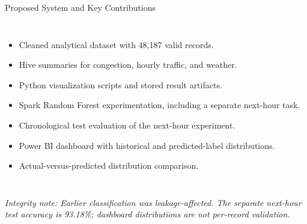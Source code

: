 \documentclass[aspectratio=169,11pt]{beamer}
\begin{document}
\begin{frame}{Proposed System and Key Contributions}
\begin{columns}[T,onlytextwidth]
\centering
{}
\begin{itemize}
\item Cleaned analytical dataset with 48,187 valid records.
\item Hive summaries for congestion, hourly traffic, and weather.
\item Python visualization scripts and stored result artifacts.
\item Spark Random Forest experimentation, including a separate next-hour task.
\item Chronological test evaluation of the next-hour experiment.
\item Power BI dashboard with historical and predicted-label distributions.
\item Actual-versus-predicted distribution comparison.
\end{itemize}
\end{columns}
\vspace{2mm}
\footnotesize\textit{Integrity note: Earlier classification was leakage-affected. The separate next-hour test accuracy is 93.18\%; dashboard distributions are not per-record validation.}
\end{frame}
\end{document}
